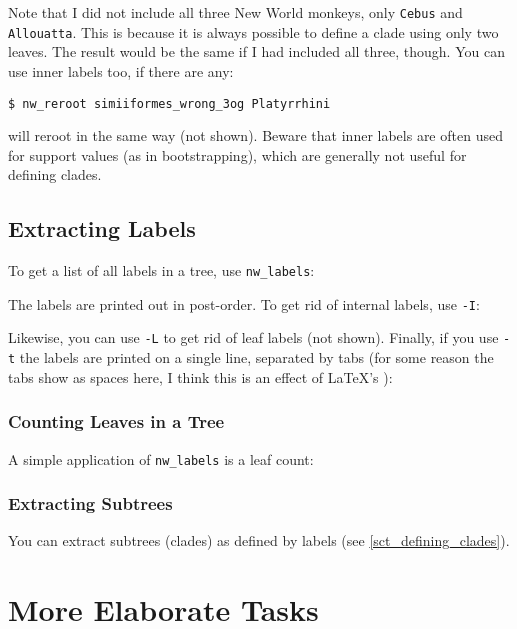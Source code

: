 \documentclass[a4paper,10pt]{report}
\newcommand{\labels}{\texttt{nw\_labels}}
\theoremstyle{definition}
\theoremstyle{definition}
\begin{document}
\noindent{}Note that I did not include all three New World monkeys, only \texttt{Cebus} and \texttt{Allouatta}. This is because it is always possible to define a clade using only two leaves. The result would be the same if I had included all three, though. You can use inner labels too, if there are any:
\begin{verbatim}
$ nw_reroot simiiformes_wrong_3og Platyrrhini
\end{verbatim}
will reroot in the same way (not shown). Beware that inner labels are often used for support values (as in bootstrapping), which are generally not useful for defining clades.

\section{Extracting Labels}
\label{sct_labels}

To get a list of all labels in a tree, use \labels:




\noindent{}The labels are printed out in post-order. To get rid of internal labels, use \texttt{-I}:




\noindent{}Likewise, you can use \texttt{-L} to get rid of leaf labels (not shown). Finally, if you use \texttt{-t} the labels are printed on a single line, separated by tabs (for some reason the tabs show as spaces here, I think this is an effect of \LaTeX{}'s \verb++):




\subsection{Counting Leaves in a Tree}
\label{sct_counting_leaves}

A simple application of \labels{} is a leaf count:




\subsection{Extracting Subtrees}
\label{sct_subtrees}

You can extract subtrees (clades) as defined by labels (see \ref{sct_defining_clades}).

\chapter{More Elaborate Tasks}
\label{chap_adv}

\appendix




\end{document}
